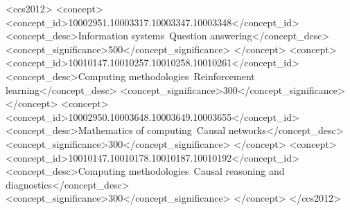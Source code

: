 \begin{CCSXML}
<ccs2012>
   <concept>
       <concept_id>10002951.10003317.10003347.10003348</concept_id>
       <concept_desc>Information systems~Question answering</concept_desc>
       <concept_significance>500</concept_significance>
       </concept>
   <concept>
       <concept_id>10010147.10010257.10010258.10010261</concept_id>
       <concept_desc>Computing methodologies~Reinforcement learning</concept_desc>
       <concept_significance>300</concept_significance>
       </concept>
   <concept>
       <concept_id>10002950.10003648.10003649.10003655</concept_id>
       <concept_desc>Mathematics of computing~Causal networks</concept_desc>
       <concept_significance>300</concept_significance>
       </concept>
   <concept>
       <concept_id>10010147.10010178.10010187.10010192</concept_id>
       <concept_desc>Computing methodologies~Causal reasoning and diagnostics</concept_desc>
       <concept_significance>300</concept_significance>
       </concept>
 </ccs2012>
\end{CCSXML}



\maketitle
